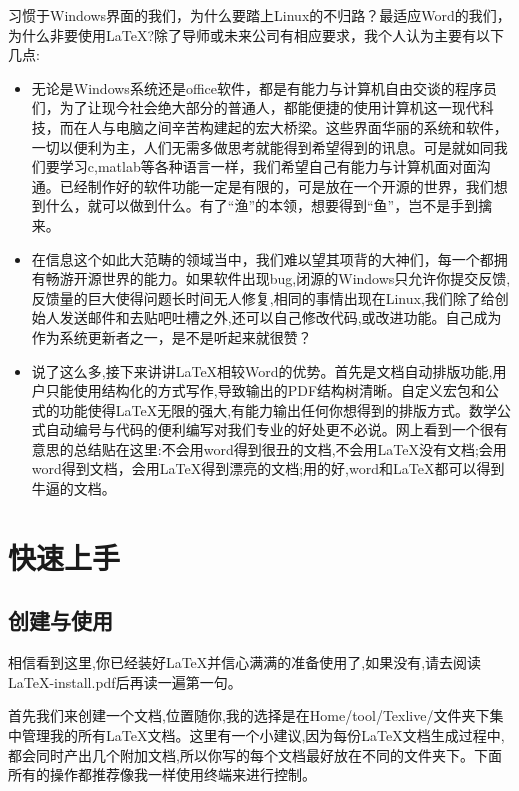 \documentclass{article}
\begin{document}
习惯于Windows界面的我们，为什么要踏上Linux的不归路？最适应Word的我们，为什么非要使用\LaTeX ?除了导师或未来公司有相应要求，我个人认为主要有以下几点:

\begin{itemize}
\item 无论是Windows系统还是office软件，都是有能力与计算机自由交谈的程序员们，为了让现今社会绝大部分的普通人，都能便捷的使用计算机这一现代科技，而在人与电脑之间辛苦构建起的宏大桥梁。这些界面华丽的系统和软件，一切以便利为主，人们无需多做思考就能得到希望得到的讯息。可是就如同我们要学习c,matlab等各种语言一样，我们希望自己有能力与计算机面对面沟通。已经制作好的软件功能一定是有限的，可是放在一个开源的世界，我们想到什么，就可以做到什么。有了“渔”的本领，想要得到“鱼”，岂不是手到擒来。

\item 在信息这个如此大范畴的领域当中，我们难以望其项背的大神们，每一个都拥有畅游开源世界的能力。如果软件出现bug,闭源的Windows只允许你提交反馈,反馈量的巨大使得问题长时间无人修复,相同的事情出现在Linux,我们除了给创始人发送邮件和去贴吧吐槽之外,还可以自己修改代码,或改进功能。自己成为作为系统更新者之一，是不是听起来就很赞？

\item 说了这么多,接下来讲讲\LaTeX 相较Word的优势。首先是文档自动排版功能,用户只能使用结构化的方式写作,导致输出的PDF结构树清晰。自定义宏包和公式的功能使得\LaTeX 无限的强大,有能力输出任何你想得到的排版方式。数学公式自动编号与代码的便利编写对我们专业的好处更不必说。网上看到一个很有意思的总结贴在这里:不会用word得到很丑的文档,不会用\LaTeX 没有文档;会用word得到文档，会用\LaTeX 得到漂亮的文档;用的好,word和\LaTeX 都可以得到牛逼的文档。
\end{itemize}
\newpage

\section{快速上手}

\subsection{创建与使用}

相信看到这里,你已经装好\LaTeX 并信心满满的准备使用了,如果没有,请去阅读LaTeX-install.pdf后再读一遍第一句。

首先我们来创建一个文档,位置随你,我的选择是在Home/tool/Texlive/文件夹下集中管理我的所有\LaTeX 文档。这里有一个小建议,因为每份\LaTeX 文档生成过程中,都会同时产出几个附加文档,所以你写的每个文档最好放在不同的文件夹下。下面所有的操作都推荐像我一样使用终端来进行控制。
\end{document}
